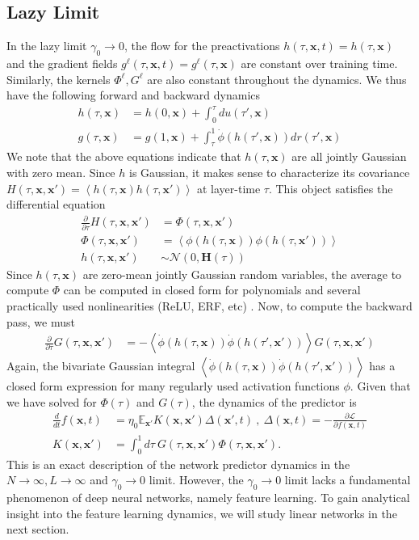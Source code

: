 \documentclass{article} %
\def\x{\bm x}
\begin{document}
\subsection{Lazy Limit}\label{app:lazy_limit}
In the lazy limit $\gamma_0 \to 0$, the flow for the preactivations $h(\tau,\x,t) = h(\tau,\x)$ and the gradient fields $g^\ell(\tau,\x,t) = g^\ell(\tau,\x)$ are constant over training time. Similarly, the kernels $\Phi^\ell, G^\ell$ are also constant throughout the dynamics. We thus have the following forward and backward dynamics
\begin{align}
    h(\tau,\x) &= h(0,\x) +  \int_0^\tau du(\tau',\x)
    \\
    g(\tau,\x) &= g(1,\x) + \int_{\tau}^{1} \dot\phi(h(\tau',\x))  dr(\tau',\x) 
\end{align}
We note that the above equations indicate that $h(\tau,\x)$ are all jointly Gaussian with zero mean. Since $h$ is Gaussian, it makes sense to characterize its covariance $H(\tau,\x,\x') = \left< h(\tau,\x) h(\tau,\x') \right>$ at layer-time $\tau$. This object satisfies the differential equation
\begin{align}
   \frac{\partial}{\partial \tau} H(\tau,\x,\x') &= \Phi(\tau,\x,\x') \nonumber
   \\ 
   \Phi(\tau,\x,\x') &= \left< \phi(h(\tau,\x)) \phi(h(\tau,\x'))  \right> \nonumber
   \\
   h(\tau,\x,\x') &\sim \mathcal{N}(0, \bm H(\tau))
\end{align}
Since $h(\tau,\x)$ are zero-mean jointly Gaussian random variables, the average to compute $\Phi$ can be computed in closed form for polynomials and several practically used nonlinearities (ReLU, ERF, etc) \citep{cho2009kernel}. Now, to compute the backward pass, we must 
\begin{align}
    \frac{\partial }{\partial \tau} G(\tau,\x,\x') &= - \left< \dot\phi(h(\tau,\x)) \dot\phi(h(\tau',\x')) \right> G(\tau,\x,\x')
\end{align}
Again, the bivariate Gaussian integral $\left< \dot\phi(h(\tau,\x)) \dot\phi(h(\tau',\x')) \right>$ has a closed form expression for many regularly used activation functions $\phi$. Given that we have solved for $\Phi(\tau)$ and $G(\tau)$, the dynamics of the predictor is
\begin{align}
    \frac{d}{dt} f(\x,t) &= \eta_0 \mathbb{E}_{\x'} K(\x,\x') \Delta(\x',t) \ , \ \Delta(\x,t) = -\frac{\partial \mathcal L}{\partial f(\x,t)} \nonumber
    \\
    K(\x,\x') &= \int_0^1 d\tau \ G(\tau,\x,\x') \Phi(\tau,\x,\x')  .
\end{align}
This is an exact description of the network predictor dynamics in the $N \to \infty, L \to \infty$ and $\gamma_0 \to 0$ limit. However, the $\gamma_0 \to 0$ limit lacks a fundamental phenomenon of deep neural networks, namely feature learning. To gain analytical insight into the feature learning dynamics, we will study linear networks in the next section.
\end{document}
